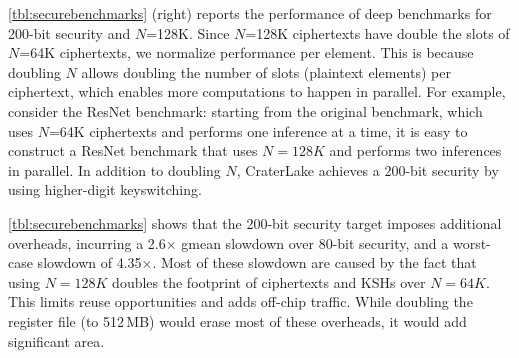 \autoref{tbl:securebenchmarks} (right) reports the performance of deep
benchmarks for 200-bit security and $N$=128K. Since $N$=128K ciphertexts have
double the slots of $N$=64K ciphertexts, we normalize performance per element.
This is because doubling $N$ allows doubling the number of slots (plaintext
elements) per ciphertext, which enables more computations to happen in
parallel. For example, consider the ResNet benchmark: starting from the
original benchmark, which uses $N$=64K ciphertexts and performs one inference
at a time, it is easy to construct a ResNet benchmark that uses $N =128K$ and
performs two inferences in parallel. In addition to doubling $N$, CraterLake
achieves a 200-bit security by using higher-digit keyswitching.

\autoref{tbl:securebenchmarks} shows that the 200-bit security target imposes
additional overheads, incurring a 2.6$\times$ gmean slowdown over 80-bit
security, and a worst-case slowdown of 4.35$\times$. Most of these slowdown are
caused by the fact that using $N =128K$ doubles the footprint of ciphertexts and
KSHs over $N =64K$. This limits reuse opportunities and adds off-chip traffic.
While doubling the register file (to 512\,MB) would erase most of these
overheads, it would add significant area.
